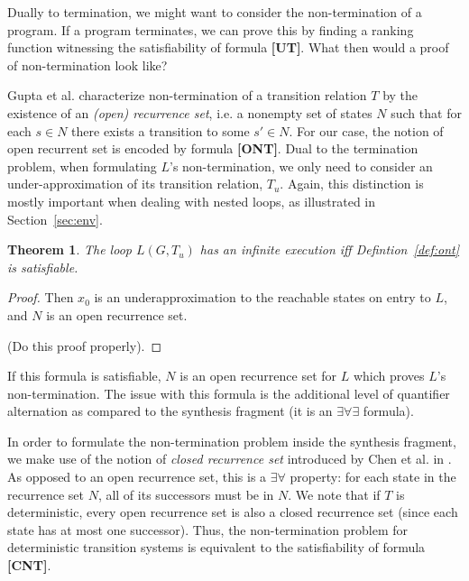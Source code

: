 \documentclass[preprint]{sigplanconf}
\newtheorem{theorem}{Theorem}
\theoremstyle{definition}
\begin{document}
Dually to termination, we might want to consider the non-termination of a program.  If a program terminates,
we can prove this by finding a ranking function %
witnessing the satisfiability of formula {\bf[UT]}.  What then would a proof of non-termination look like?

Gupta et al. \cite{DBLP:conf/popl/GuptaHMRX08} characterize non-termination of a transition relation $T$ by the existence of an \emph{(open) recurrence set},
i.e. a nonempty set of states $N$ such that for each $s \in N$ there
exists a transition to some $s'\in N$.
For our case, the notion of open recurrent set is encoded by formula {\bf [ONT]}. %
Dual to the termination problem, when formulating $L$'s non-termination, we only need to consider an under-approximation of its transition relation, $T_u$. 
Again, this distinction is mostly important when dealing with nested loops, as illustrated in Section~\ref{sec:env}.


\begin{theorem}
\label{thm:ont}
 The loop $L(G, T_u)$ has an infinite execution iff Defintion~\ref{def:ont} is satisfiable.
\end{theorem}

\begin{proof}
 Then $x_0$ is an underapproximation to the reachable states on entry to $L$, and $N$ is an open recurrence set.
 
 (Do this proof properly).
\end{proof}

If this formula is satisfiable, $N$ is an open recurrence set for $L$ which proves
$L$'s non-termination. The issue with this formula is the additional level of quantifier alternation as compared to the synthesis fragment
(it is an $\exists \forall \exists$ formula). %

In order to formulate the non-termination problem inside the synthesis fragment, 
we make use of the notion of \emph{closed recurrence set} introduced by Chen et al. in \cite{DBLP:conf/tacas/ChenCFNO14}. 
As opposed to an open recurrence set, this is a $\exists \forall$ property: for each state in the recurrence set $N$, all of its successors 
must be in $N$. We note that if $T$ is deterministic, every open recurrence set is also a closed recurrence set (since each
state has at most one successor).  Thus, the non-termination problem for deterministic transition systems is equivalent to the
satisfiability of formula {\bf [CNT]}. %
\end{document}
